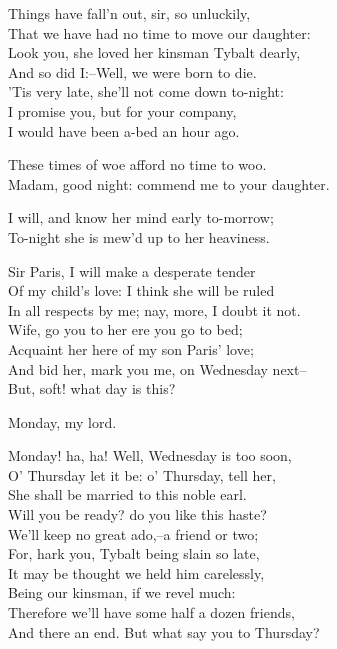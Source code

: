  
\begin{speech}
Things have fall'n out, sir, so unluckily, \\
That we have had no time to move our daughter: \\
Look you, she loved her kinsman Tybalt dearly, \\
And so did I:--Well, we were born to die. \\
'Tis very late, she'll not come down to-night: \\
I promise you, but for your company, \\
I would have been a-bed an hour ago. \\
\end{speech}
\begin{speech}
These times of woe afford no time to woo. \\
Madam, good night: commend me to your daughter. \\
\end{speech}
\begin{speech}
I will, and know her mind early to-morrow; \\

To-night she is mew'd up to her heaviness. \\
\end{speech}
\begin{speech}
Sir Paris, I will make a desperate tender \\
Of my child's love: I think she will be ruled \\
In all respects by me; nay, more, I doubt it not. \\
Wife, go you to her ere you go to bed; \\
Acquaint her here of my son Paris' love; \\
And bid her, mark you me, on Wednesday next-- \\
But, soft! what day is this? \\
\end{speech}
\begin{speech}
Monday, my lord. \\
\end{speech}
\begin{speech}
Monday! ha, ha!   Well, Wednesday is too soon, \\

O' Thursday let it be: o' Thursday, tell her, \\
She shall be married to this noble earl. \\
Will you be ready? do you like this haste? \\
We'll keep no great ado,--a friend or two; \\
For, hark you, Tybalt being slain so late, \\
It may be thought we held him carelessly, \\
Being our kinsman, if we revel much: \\
Therefore we'll have some half a dozen friends, \\
And there an end. But what say you to Thursday? \\
\end{speech}
